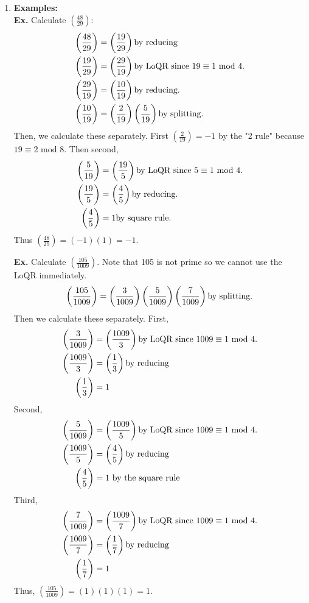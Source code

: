 \documentclass[class=article, crop=false]{standalone}
\begin{document}
\begin{enumerate}
	\item \textbf{Examples:}\\
	\textbf{Ex.} Calculate $\left(\frac{48}{29}\right)$:
	\begin{align*}
		\left(\frac{48}{29}\right) &= \left(\frac{19}{29}\right) \hfill\text{by reducing} \\
		\left(\frac{19}{29}\right) &= \left(\frac{29}{19}\right) \hfill\text{by LoQR since $19\equiv 1\mbox{ mod } 4$.} \\
		\left(\frac{29}{19}\right) &= \left(\frac{10}{19}\right) \hfill\text{by reducing.} \\
		\left(\frac{10}{19}\right) &= \left(\frac{2}{19}\right) \left(\frac{5}{19}\right) \hfill\text{by splitting.}
	\end{align*}
	Then, we calculate these separately. First $\left(\frac{2}{19}\right) = -1$ by the
	"2 rule" because $19\equiv 2\mbox{ mod } 8$. Then second, 
	\begin{align*}
		\left(\frac{5}{19}\right) &= \left(\frac{19}{5}\right) \hfill\text{by LoQR since $5\equiv 1\mbox{ mod } 4$.} \\
		\left(\frac{19}{5}\right) &= \left(\frac{4}{5}\right) \hfill\text{by reducing.} \\
		\left(\frac{4}{5}\right) &= 1 \hfill\text{by square rule.}
	\end{align*}
	Thus $\left(\frac{48}{29}\right) = (-1)(1)=-1$.

	\textbf{Ex.} Calculate $\left(\frac{105}{1009}\right)$. Note that 105 is not prime so we
	cannot use the LoQR immediately.
		$$\left(\frac{105}{1009}\right) = \left(\frac{3}{1009}\right) \left(\frac{5}{1009}\right) 
		\left(\frac{7}{1009}\right) \hfill\text{by splitting.}$$
	Then we calculate these separately. 
	First,
	\begin{align*}
		\left(\frac{3}{1009}\right) &= \left(\frac{1009}{3}\right) \hfill\text{by LoQR since $1009\equiv 1\mbox{ mod } 4$.} \\
		\left(\frac{1009}{3}\right) &= \left(\frac{1}{3}\right) \hfill\text{by reducing} \\
		\left(\frac{1}{3}\right) &= 1
	\end{align*}
	Second,
	\begin{align*}
		\left(\frac{5}{1009}\right) &= \left(\frac{1009}{5}\right) \hfill\text{by LoQR since $1009\equiv 1\mbox{ mod } 4$.} \\
		\left(\frac{1009}{5}\right) &= \left(\frac{4}{5}\right) \hfill\text{by reducing} \\
		\left(\frac{4}{5}\right) &= 1 \hfill\text{ by the square rule}
 	\end{align*}
	Third,
	\begin{align*}
		\left(\frac{7}{1009}\right) &= \left(\frac{1009}{7}\right) \hfill\text{by LoQR since $1009 \equiv 1\mbox{ mod } 4$.} \\
		\left(\frac{1009}{7}\right) &= \left(\frac{1}{7}\right) \hfill\text{by reducing} \\
		\left(\frac{1}{7}\right) &= 1
	\end{align*}
	Thus, $\left(\frac{105}{1009}\right) = (1)(1)(1) = 1$.
\end{enumerate}
\end{document}
